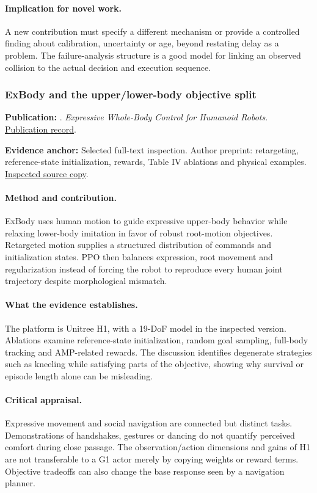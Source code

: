 \paragraph{Implication for novel work.} A new contribution must specify a different mechanism or provide a controlled finding about calibration, uncertainty or age, beyond restating delay as a problem. The failure-analysis structure is a good model for linking an observed collision to the actual decision and execution sequence.

\subsubsection{ExBody and the upper/lower-body objective split}\label{paper:expressive}
\textbf{Publication:} \citet{expressive}. \emph{Expressive Whole-Body Control for Humanoid Robots}. \href{https://doi.org/10.15607/rss.2024.xx.107}{Publication record}.

\textbf{Evidence anchor:} Selected full-text inspection. Author preprint: retargeting, reference-state initialization, rewards, Table IV ablations and physical examples. \href{https://arxiv.org/pdf/2402.16796}{Inspected source copy}.

\paragraph{Method and contribution.} ExBody uses human motion to guide expressive upper-body behavior while relaxing lower-body imitation in favor of robust root-motion objectives. Retargeted motion supplies a structured distribution of commands and initialization states. PPO then balances expression, root movement and regularization instead of forcing the robot to reproduce every human joint trajectory despite morphological mismatch.

\paragraph{What the evidence establishes.} The platform is Unitree H1, with a 19-DoF model in the inspected version. Ablations examine reference-state initialization, random goal sampling, full-body tracking and AMP-related rewards. The discussion identifies degenerate strategies such as kneeling while satisfying parts of the objective, showing why survival or episode length alone can be misleading.

\paragraph{Critical appraisal.} Expressive movement and social navigation are connected but distinct tasks. Demonstrations of handshakes, gestures or dancing do not quantify perceived comfort during close passage. The observation/action dimensions and gains of H1 are not transferable to a G1 actor merely by copying weights or reward terms. Objective tradeoffs can also change the base response seen by a navigation planner.

